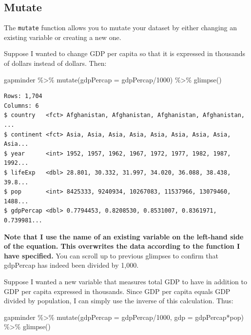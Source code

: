 \documentclass[
]{book}
\makeatletter
\newenvironment{Shaded}{\begin{snugshade}}{\end{snugshade}}
\newcommand{\AttributeTok}[1]{\textcolor[rgb]{0.61,0.61,0.61}{#1}}
\newcommand{\DecValTok}[1]{\textcolor[rgb]{0.06,0.06,0.06}{#1}}
\newcommand{\FunctionTok}[1]{\textcolor[rgb]{0,0,0}{#1}}
\newcommand{\NormalTok}[1]{#1}
\newcommand{\SpecialCharTok}[1]{\textcolor[rgb]{0,0,0}{#1}}
\newenvironment{kframe}{%
\medskip{}
\setlength{\fboxsep}{.8em}
 \def\at@end@of@kframe{}%
 \ifinner\ifhmode%
  \def\at@end@of@kframe{\end{minipage}}%
  \begin{minipage}{\columnwidth}%
 \fi\fi%
 \def\FrameCommand##1{\hskip\@totalleftmargin \hskip-\fboxsep
 \colorbox{shadecolor}{##1}\hskip-\fboxsep
     \hskip-\linewidth \hskip-\@totalleftmargin \hskip\columnwidth}%
 \MakeFramed {\advance\hsize-\width
   \@totalleftmargin\z@ \linewidth\hsize
   \@setminipage}}%
 {\par\unskip\endMakeFramed%
 \at@end@of@kframe}
\renewenvironment{Shaded}{\begin{kframe}}{\end{kframe}}
\makeatother
\begin{document}
\hypertarget{mutate}{%
\subsection{Mutate}\label{mutate}}

The \texttt{mutate} function allows you to mutate your dataset by either changing an existing variable or creating a new one.

Suppose I wanted to change GDP per capita so that it is expressed in thousands of dollars instead of dollars. Then:

\begin{Shaded}
\begin{Highlighting}[]
\NormalTok{gapminder }\SpecialCharTok{\%\textgreater{}\%} 
  \FunctionTok{mutate}\NormalTok{(}\AttributeTok{gdpPercap =}\NormalTok{ gdpPercap}\SpecialCharTok{/}\DecValTok{1000}\NormalTok{) }\SpecialCharTok{\%\textgreater{}\%} 
  \FunctionTok{glimpse}\NormalTok{()}
\end{Highlighting}
\end{Shaded}

\begin{verbatim}
Rows: 1,704
Columns: 6
$ country   <fct> Afghanistan, Afghanistan, Afghanistan, Afghanistan, ...
$ continent <fct> Asia, Asia, Asia, Asia, Asia, Asia, Asia, Asia, Asia...
$ year      <int> 1952, 1957, 1962, 1967, 1972, 1977, 1982, 1987, 1992...
$ lifeExp   <dbl> 28.801, 30.332, 31.997, 34.020, 36.088, 38.438, 39.8...
$ pop       <int> 8425333, 9240934, 10267083, 11537966, 13079460, 1488...
$ gdpPercap <dbl> 0.7794453, 0.8208530, 0.8531007, 0.8361971, 0.739981...
\end{verbatim}

\textbf{Note that I use the name of an existing variable on the left-hand side of the equation. This overwrites the data according to the function I have specified.} You can scroll up to previous glimpses to confirm that gdpPercap has indeed been divided by 1,000.

Suppose I wanted a new variable that measures total GDP to have in addition to GDP per capita expressed in thousands. Since GDP per capita equals GDP divided by population, I can simply use the inverse of this calculation. Thus:

\begin{Shaded}
\begin{Highlighting}[]
\NormalTok{gapminder }\SpecialCharTok{\%\textgreater{}\%} 
  \FunctionTok{mutate}\NormalTok{(}\AttributeTok{gdpPercap =}\NormalTok{ gdpPercap}\SpecialCharTok{/}\DecValTok{1000}\NormalTok{,}
         \AttributeTok{gdp =}\NormalTok{ gdpPercap}\SpecialCharTok{*}\NormalTok{pop) }\SpecialCharTok{\%\textgreater{}\%} 
  \FunctionTok{glimpse}\NormalTok{()}
\end{Highlighting}
\end{Shaded}
\end{document}
